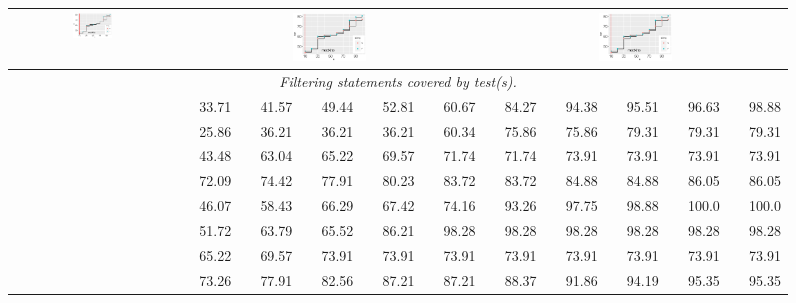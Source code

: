 \documentclass[sigplan,10pt,review,anonymous]{acmart}\settopmatter{printfolios=true,printccs=false,printacmref=false}
\begin{document}
\begin{figure}[!ht]
\begin{tabular}{cl|rrrrrrrrrr}
      \multicolumn{2}{c}{\includegraphics[width=0.25\textwidth]{R/mockito-onefailingtest.pdf}}
      &
      \multicolumn{5}{c}{\includegraphics[width=0.25\textwidth]{R/mockito-onefailingtest.pdf}}
      &
      \multicolumn{5}{c}{\includegraphics[width=0.25\textwidth]{R/mockito-onefailingtest.pdf}}\\

      \midrule

      \multicolumn{12}{c}{\emph{Filtering statements covered by test(s).}}\\
      \midrule
      \parbox[t]{2mm}{}
      & \lang{}     & 33.71 & 41.57 & 49.44 & 52.81 & 60.67 & 84.27 & 94.38 & 95.51 & 96.63 & 98.88 \\
      & \chart{}    & 25.86& 36.21& 36.21& 36.21& 60.34& 75.86& 75.86 & 79.31& 79.31& 79.31 \\
      & \jtime{}       & 43.48 & 63.04 & 65.22 & 69.57 & 71.74 & 71.74 &73.91 & 73.91 & 73.91 & 73.91 \\
      & \mockito{} & 72.09 & 74.42 & 77.91 & 80.23 & 83.72 & 83.72 & 84.88 & 84.88 & 86.05 & 86.05 \\
      \midrule
      \parbox[t]{2mm}{}
      & \lang{}     & 46.07 & 58.43 & 66.29 & 67.42 & 74.16 & 93.26 & 97.75 & 98.88 & 100.0 & 100.0 \\
      & \chart{} & 51.72& 63.79& 65.52& 86.21& 98.28& 98.28& 98.28& 98.28& 98.28& 98.28 \\
      & \jtime{} & 65.22 & 69.57 & 73.91 & 73.91 & 73.91 & 73.91 & 73.91 & 73.91 & 73.91 & 73.91 \\
      & \mockito{} & 73.26 & 77.91 & 82.56 & 87.21 & 87.21 & 88.37 &91.86 & 94.19 & 95.35 & 95.35 \\
      \midrule


\end{tabular}
\end{figure}
\end{document}
